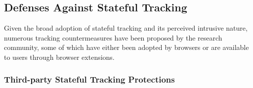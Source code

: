 \subsection{Defenses Against Stateful Tracking}
\label{sec:stateful-defenses}

Given the broad adoption of stateful tracking and its perceived intrusive nature, numerous tracking countermeasures have been proposed by the research community, some of which have either been adopted by browsers or are available to users through browser extensions.


\subsubsection{Third-party Stateful Tracking Protections}

